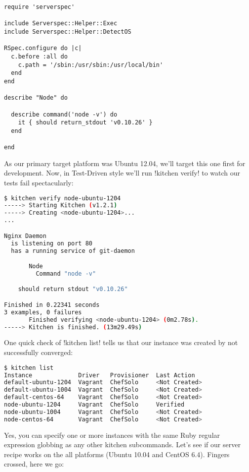 \begin{lstlisting}[label=lst:testing-test-kitchen39]
require 'serverspec'

include Serverspec::Helper::Exec
include Serverspec::Helper::DetectOS

RSpec.configure do |c|
  c.before :all do
    c.path = '/sbin:/usr/sbin:/usr/local/bin'
  end
end

describe "Node" do

  describe command('node -v') do
    it { should return_stdout 'v0.10.26' }
  end

end
\end{lstlisting}

As our primary target platform was Ubuntu 12.04, we'll target this one first for development. Now, in Test-Driven style we'll run \inline!kitchen verify! to watch our tests fail spectacularly:

\begin{lstlisting}[language=Bash,label=lst:testing-test-kitchen40]
$ kitchen verify node-ubuntu-1204
-----> Starting Kitchen (v1.2.1)
-----> Creating <node-ubuntu-1204>...
...

Nginx Daemon
  is listening on port 80
  has a running service of git-daemon

       Node
         Command "node -v"

    should return stdout "v0.10.26"

Finished in 0.22341 seconds
3 examples, 0 failures
       Finished verifying <node-ubuntu-1204> (0m2.78s).
-----> Kitchen is finished. (13m29.49s)

\end{lstlisting}

One quick check of \inline!kitchen list! tells us that our instance was created by not successfully converged:

\begin{lstlisting}[language=Bash,label=lst:testing-test-kitchen41]
$ kitchen list
Instance             Driver   Provisioner  Last Action
default-ubuntu-1204  Vagrant  ChefSolo     <Not Created>
default-ubuntu-1004  Vagrant  ChefSolo     <Not Created>
default-centos-64    Vagrant  ChefSolo     <Not Created>
node-ubuntu-1204     Vagrant  ChefSolo     Verified
node-ubuntu-1004     Vagrant  ChefSolo     <Not Created>
node-centos-64       Vagrant  ChefSolo     <Not Created>
\end{lstlisting}

Yes, you can specify one or more instances with the same Ruby regular expression globbing as any other kitchen subcommands. Let's see if our server recipe works on the all platforms (Ubuntu 10.04 and CentOS 6.4). Fingers crossed, here we go:

